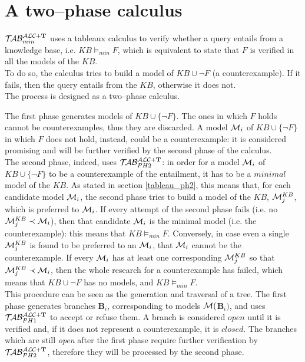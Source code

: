 \documentclass[a4paper, 11pt, oneside]{duthesis}
\newcommand{\tip}{{\bf T}}
\newcommand{\unione} {\cup}
\newcommand{\nott} {\lnot}
\newcommand{\emme} {\begin{mathcal}M\end{mathcal}}
\newcommand{\nuovoc}{\mathrel{{\mathcal{T}\!\mathcal{AB}}}_{min}^{\mathcal{ALC}+\mbox{\scriptsize $\tip$}}}
\newcommand{\primo}{\mathrel{{\mathcal{T}\!\mathcal{AB}}}_{PH 1}^{\mathcal{ALC}+\mbox{\scriptsize $\tip$}}}
\newcommand{\secondo}{\mathrel{{\mathcal{T}\!\mathcal{AB}}}_{PH 2}^{\mathcal{ALC}+\mbox{\scriptsize $\tip$}}}
\begin{document}
\section{A two--phase calculus}\label{calc_2ph}

$\nuovoc$ uses a tableaux calculus to verify whether a query entails from a knowledge base, i.e. $KB \models_{min} F$, which is equivalent to state that $F$ is verified in all the models of the $KB$.\\
To do so, the calculus tries to build a model of $KB \unione \neg F$ (a counterexample). If it fails, then the query entails from the $KB$, otherwise it does not.\\

The process is designed as a two--phase calculus.

The first phase generates models of $KB \unione \{\nott F\}$. The ones in which $F$ holds cannot be counterexamples, thus they are discarded. A model $\emme_i$ of $KB \unione \{\nott F\}$ in which $F$ does not hold, instead, could be a counterexample: it is considered promising and will be further verified by the second phase of the calculus.\\
The second phase, indeed, uses $\secondo$: in order for a model $\emme_i$ of $KB \unione \{\nott F\}$ to be a counterexample of the entailment, it has to be a $minimal$ model of the $KB$. As stated in section \ref{tableau_ph2}, this means that, for each candidate model $\emme_i$, the second phase tries to build a model of the $KB$, $\emme_j^{KB}$, which is preferred to $\emme_i$. If every attempt of the second phase fails (i.e. no $\emme_j^{KB} \prec \emme_i$), then that candidate $\emme_i$ is the minimal model (i.e. the counterexample): this means that $KB \models_{min} F$.
Conversely, in case even a single $\emme_j^{KB}$ is found to be preferred to an $\emme_i$, that $\emme_i$ cannot be the counterexample.
If every $\emme_i$ has at least one corresponding $\emme_j^{KB}$ so that $\emme_j^{KB} \prec \emme_i$, then the whole research for a counterexample has failed, which means that $KB \unione \neg F$ has no models, and $KB \models_{min} F$.\\

This procedure can be seen as the generation and traversal of a tree.
The first phase generates branches \textbf{B}$_i$, corresponding to models $\emme($\textbf{B}$_i)$, and uses $\primo$ to accept or refuse them.
A branch is considered $open$ until it is verified and, if it does not represent a counterexample, it is $closed$. The branches which are still \emph{open} after the first phase require further verification by $\secondo$, therefore they will be processed by the second phase.\\
\end{document}
